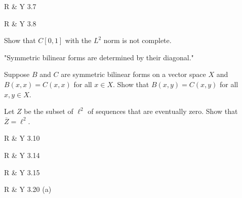 \documentclass[minion]{homework}
\begin{document}
\begin{aproblems}



\hproblem R \& Y 3.7

\hproblem R \& Y 3.8

\hproblem Show that $C[0,1]$ with the $L^2$ norm is not complete.

\hproblem "Symmetric bilinear forms are determined by their diagonal."

Suppose $B$ and $C$ are symmetric bilinear
forms on a vector space $X$ and $B(x,x)=C(x,x)$ for all
$x\in X$.  Show that $B(x,y)=C(x,y)$ for all $x,y\in X$.

\hproblem Let $Z$ be the subset of $\ell^2$ of sequences
that are eventually zero.  Show that $\overline Z  = \ell^2$.

\hproblem R \& Y 3.10

\hproblem R \& Y 3.14

\hproblem R \& Y 3.15

\hproblem R \& Y 3.20 (a)

\end{aproblems}
\end{document}

